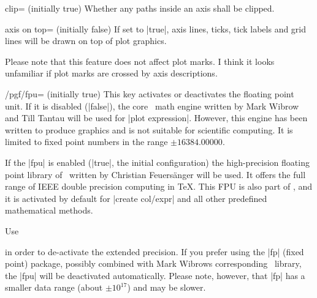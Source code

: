 \begin{pgfplotskey}{clip= (initially true)}
	Whether any paths inside an axis shall be clipped.
\end{pgfplotskey}

\begin{pgfplotskey}{axis on top= (initially false)}
	If set to |true|, axis lines, ticks, tick labels and grid lines will be drawn on top of plot graphics.
\begin{codeexample}[]
\end{codeexample}

\begin{codeexample}[]
\end{codeexample}
Please note that this feature does not affect plot marks. I think it looks unfamiliar if plot marks are crossed by axis descriptions.
\end{pgfplotskey}

\begin{key}{/pgf/fpu= (initially true)}
	This key activates or deactivates the floating point unit. If it is disabled (|false|), the core \PGF\ math engine written by Mark Wibrow and Till Tantau will be used for |plot expression|.
	However, this engine has been written to produce graphics and is not suitable for scientific computing. It is limited to fixed point numbers in the range $\pm 16384.00000$.

	If the |fpu| is enabled (|true|, the initial configuration) the high-precision floating point library of \PGF\ written by Christian Feuers\"anger will be used. It offers the full range of IEEE double precision computing in \TeX. This FPU is also part of \PGFPlotstable, and it is activated by default for |create col/expr| and all other predefined mathematical methods.

	Use
\begin{codeexample}
\end{codeexample}
	\noindent in order to de-activate the extended precision. If you prefer using the |fp| (fixed point) package, possibly combined with Mark Wibrows corresponding \PGF\ library, the |fpu| will be deactivated automatically. Please note, however, that |fp| has a smaller data range (about $\pm 10^{17}$) and may be slower.
\end{key}
